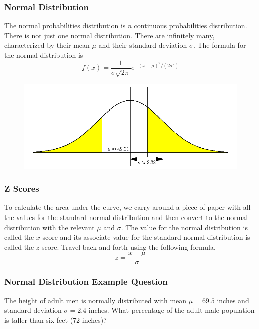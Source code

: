 \documentclass[xcolor=dvipsnames]{beamer}
\begin{document}
\begin{frame}
  \frametitle{Normal Distribution}
  The normal probabilities distribution is a \alert{continuous}
  probabilities distribution. There is not just one normal
  distribution. There are infinitely many, characterized by their
  \alert{mean $\mu$} and their \alert{standard deviation $\sigma$}.
  The formula for the normal distribution is
  \begin{equation}
    \label{eq:aitoolah}
    f(x)=\frac{1}{\sigma\sqrt{2\pi}}e^{-(x-\mu)^{2}/(2\sigma^{2})}
  \end{equation}
  \begin{figure}[h]
    \includegraphics[scale=.4]{./diagrams/qfour.png}
  \end{figure}
\end{frame}

\begin{frame}
  \frametitle{Z Scores}
  To calculate the area under the curve, we carry around a piece of
  paper with all the values for the \alert{standard normal
    distribution} and then convert to the normal distribution with the
  relevant $\mu$ and $\sigma$. The value for the normal distribution
  is called the \alert{$x$-score} and its associate value for the
  standard normal distribution is called the \alert{$z$-score}. Travel
  back and forth using the following formula,
  \begin{equation}
    \label{eq:uotoogoo}
    z=\frac{x-\mu}{\sigma}
  \end{equation}
\end{frame}

\begin{frame}
  \frametitle{Normal Distribution Example Question}
   The height of adult men is normally
  distributed with mean $\mu=69.5$ inches and standard deviation
  $\sigma=2.4$ inches. What percentage of the adult male population is
  taller than six feet (72 inches)? 
\end{frame}
\end{document}
